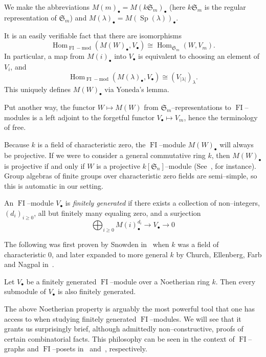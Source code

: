 \documentclass[ALCO,ThmDefs,Unicode,epreuves]{cedram}
\DeclareMathOperator{\FI}{FI}
\DeclareMathOperator{\Hom}{Hom}
\DeclareMathOperator{\Sp}{Sp}
\newcommand{\Sn}{\mathfrak{S}}
\newcommand{\dt}{\bullet}
\begin{document}
We make the abbreviations $M(m)_\dt = M(k \Sn_m)_\dt$ (here $k \Sn_m$ is the regular representation of $\Sn_m$) and $M(\lambda)_\dt = M(\Sp(\lambda))_\dt$.



\begin{remark}\label{yoneda}
It is an easily verifiable fact that there are isomorphisms
\[
\Hom_{\FI-\text{mod}}(M(W)_\dt,V_\dt) \cong \Hom_{\Sn_m}(W,V_m).
\]
In particular, a map from $M(i)_\dt$ into $V_\dt$ is equivalent to choosing an element of $V_i$, and $$\Hom_{\FI-\text{mod}}(M(\lambda)_\dt, V_\dt) \cong (V_{|\lambda|})_{\lambda}.$$ This uniquely defines $M(W)_\dt$ via Yoneda's lemma.

Put another way, the functor $W \mapsto M(W)$ from $\Sn_m$--representations to $\FI$--modules is a left adjoint to the forgetful functor $V_\dt \mapsto V_m$, hence the terminology of free.
\end{remark}


\begin{remark}
Because $k$ is a field of characteristic zero, the $\FI$--module $M(W)_\dt$ will always be projective. If we were to consider a general commutative ring $k$, then $M(W)_\dt$ is projective if and only if $W$ is a projective $k[\Sn_n]$--module (See~\cite{R}, for instance). Group algebras of finite groups over characteristic zero fields are semi--simple, so this is automatic in our setting.
\end{remark}


An $\FI$--module $V_\dt$ is \emph{finitely generated} if there exists a collection of non--integers, $(d_i)_{i\geq 0}$, all but finitely many equaling zero, and a surjection
\[
\bigoplus_{i \geq 0} M(i)_\dt^{d_i} \rightarrow V_\dt \rightarrow 0
\]

The following was first proven by Snowden in~\cite{S} when $k$ was a field of characteristic 0, and later expanded to more general $k$ by Church, Ellenberg, Farb and Nagpal in~\cite{CEF,CEFN}.

\begin{theorem}\label{noeth}
Let $V_\dt$ be a finitely generated $\FI$--module over a Noetherian ring $k$. Then every submodule of $V_\dt$ is also finitely generated.
\end{theorem}

The above Noetherian property is arguably the most powerful tool that one has access to when studying finitely generated $\FI$--modules. We will see that it grants us surprisingly brief, although admittedly non--constructive, proofs of certain combinatorial facts. This philosophy can be seen in the context of $\FI$--graphs and $\FI$--posets in~\cite{RW} and~\cite{G}, respectively.
\end{document}
